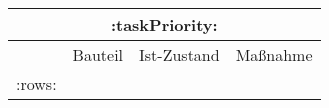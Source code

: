 \begin{longtable}{p{0pt}@{} p{\tabellephyssollistmnA}| p{\tabellephyssollistmnB}| p{\tabellephyssollistmnC}}
    \hline
    \multicolumn{4}{c}{
            \cellcolor{\mtabellenzweitekopfhintergrundfarbe}
            \textcolor{\mtabellenkopfschriftfarbe}{\textbf{:taskPriority:}}
    } \\ \hline
    \rowcolor{\mtabellenhintergrund}
    &Bauteil&Ist-Zustand&Maßnahme \\ \hline 
    :rows:
\end{longtable}